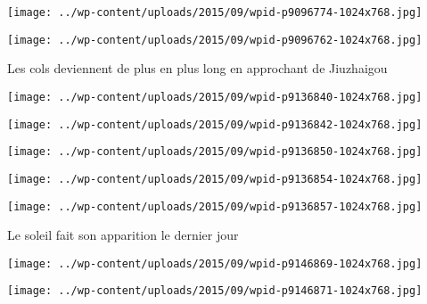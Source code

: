  \newline
\centerline{\texttt{[image: ../wp-content/uploads/2015/09/wpid-p9096774-1024x768.jpg]} } 
 \newline
 \newline
\centerline{\texttt{[image: ../wp-content/uploads/2015/09/wpid-p9096762-1024x768.jpg]} } 
 \newline
 Les cols deviennent de plus en plus long en approchant de Jiuzhaigou \newline
 \newline
\centerline{\texttt{[image: ../wp-content/uploads/2015/09/wpid-p9136840-1024x768.jpg]} } 
 \newline
 \newline
\centerline{\texttt{[image: ../wp-content/uploads/2015/09/wpid-p9136842-1024x768.jpg]} } 
 \newline
 \newline
\centerline{\texttt{[image: ../wp-content/uploads/2015/09/wpid-p9136850-1024x768.jpg]} } 
 \newline
 \newline
\centerline{\texttt{[image: ../wp-content/uploads/2015/09/wpid-p9136854-1024x768.jpg]} } 
 \newline
 \newline
\centerline{\texttt{[image: ../wp-content/uploads/2015/09/wpid-p9136857-1024x768.jpg]} } 
 \newline
 Le soleil fait son apparition le dernier jour \newline
 \newline
\centerline{\texttt{[image: ../wp-content/uploads/2015/09/wpid-p9146869-1024x768.jpg]} } 
 \newline
 \newline
\centerline{\texttt{[image: ../wp-content/uploads/2015/09/wpid-p9146871-1024x768.jpg]} } 
 \newline

\newpage
 
